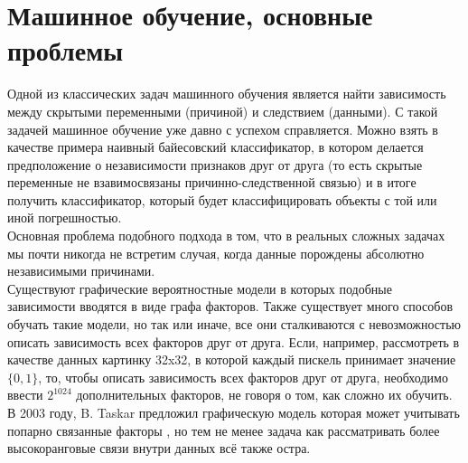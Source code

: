 \documentclass[a4paper,10pt]{article}
\begin{document}
\section{Машинное обучение, основные проблемы}
\label{sec:ml}
Одной из классических задач машинного обучения является найти зависимость между скрытыми переменными (причиной) и следствием (данными). С такой задачей машинное обучение уже давно с успехом справляется. Можно взять в качестве примера наивный байесовский классификатор, в котором делается предположение о независимости признаков друг от друга (то есть скрытые переменные не взавимосвязаны причинно-следственной связью) и в итоге получить классификатор, который будет классифицировать объекты с той или иной погрешностью.\\
\indent Основная проблема подобного подхода в том, что в реальных сложных задачах мы почти никогда не встретим случая, когда данные порождены абсолютно независимыми причинами.\\
\indent Существуют графические вероятностные модели \cite{prob_graph} в которых подобные зависимости вводятся в виде графа факторов. Также существует много способов обучать такие модели, но так или иначе, все они сталкиваются с невозможностью описать зависимость всех факторов друг от друга. Если, например, рассмотреть в качестве данных картинку 32x32, в которой каждый пискель принимает значение $\{0,1\}$, то, чтобы описать зависимость всех факторов друг от друга, необходимо ввести $2^{1024}$ дополнительных факторов, не говоря о том, как сложно их обучить.\\
\indent В 2003 году, B. Taskar предложил графическую модель которая может учитывать попарно связанные факторы \cite{taskar}, но тем не менее задача как рассматривать более высокоранговые связи внутри данных всё также остра.
\end{document}

